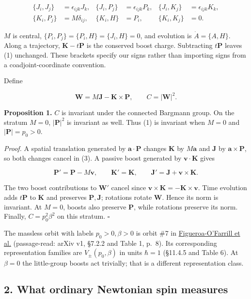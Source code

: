 \documentclass[11pt,a4paper]{article}
\begin{document}
\[
\begin{aligned}
\{J_i,J_j\}&=\epsilon_{ijk}J_k,&
\{J_i,P_j\}&=\epsilon_{ijk}P_k,&
\{J_i,K_j\}&=\epsilon_{ijk}K_k,\\
\{K_i,P_j\}&=M\delta_{ij},&
\{K_i,H\}&=P_i,&
\{K_i,K_j\}&=0.
\end{aligned} \tag{2}
\]

\(M\) is central, \(\{P_i,P_j\}=\{P_i,H\}=\{J_i,H\}=0\), and evolution
is \(\dot A=\{A,H\}\). Along a trajectory, \(\mathbf K-t\mathbf P\) is
the conserved boost charge. Subtracting \(t\mathbf P\) leaves (1)
unchanged. These brackets specify our signs rather than importing signs
from a coadjoint-coordinate convention.

Define

\[
\mathbf W=M\mathbf J-\mathbf K\times\mathbf P,
\qquad C=|\mathbf W|^2. \tag{3}
\]

\textbf{Proposition 1.} \(C\) is invariant under the connected Bargmann
group. On the stratum \(M=0\), \(|\mathbf P|^2\) is invariant as well.
Thus (1) is invariant when \(M=0\) and \(|\mathbf P|=p_0>0\).

\emph{Proof.} A spatial translation generated by
\(\mathbf a\cdot\mathbf P\) changes \(\mathbf K\) by \(M\mathbf a\) and
\(\mathbf J\) by \(\mathbf a\times\mathbf P\), so both changes cancel in
(3). A passive boost generated by \(\mathbf v\cdot\mathbf K\) gives

\[
\mathbf P'=\mathbf P-M\mathbf v,\qquad
\mathbf K'=\mathbf K,\qquad
\mathbf J'=\mathbf J+\mathbf v\times\mathbf K. \tag{4}
\]

The two boost contributions to \(\mathbf W'\) cancel since
\(\mathbf v\times\mathbf K=-\mathbf K\times\mathbf v\). Time evolution
adds \(t\mathbf P\) to \(\mathbf K\) and preserves
\(\mathbf P,\mathbf J\); rotations rotate \(\mathbf W\). Hence its norm
is invariant. At \(M=0\), boosts also preserve \(\mathbf P\), while
rotations preserve its norm. Finally, \(C=p_0^2\beta^2\) on this
stratum. \(\square\)

The massless orbit with labels \(p_0>0,\beta>0\) is orbit \#7 in
\href{https://arxiv.org/pdf/2401.03241v1}{Figueroa-O'Farrill et al.}
(passage-read: arXiv v1, §7.2.2 and Table 1, p.~8). Its corresponding
representation families are \(V_\pm(p_0,\beta)\) in units \(\hbar=1\)
(§11.4.5 and Table 6). At \(\beta=0\) the little-group boosts act
trivially; that is a different representation class.

\hypertarget{what-ordinary-newtonian-spin-measures}{%
\subsection{2. What ordinary Newtonian spin
measures}\label{what-ordinary-newtonian-spin-measures}}
\end{document}
